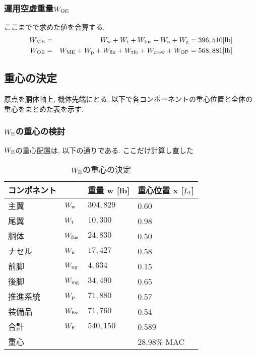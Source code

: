 \documentclass[12pt]{jsarticle}
\begin{document}
\subsubsection{運用空虚重量$W_{\rm OE}$}
ここまでで求めた値を合算する.
\begin{eqnarray*}
W_{\rm ME} &=& W_{\rm w} + W_{\rm t} + W_{\rm fus} + W_{\rm n} + W_{\rm g} = 396,510 [\rm lb] \\
W_{\rm OE} &=& W_{\rm ME} + W_{\rm p} + W_{\rm fix} + W_{\rm tfo} + W_{\rm crew} + W_{\rm OP} = 568,881 [\rm lb]
\end{eqnarray*}

\subsection{重心の決定}
原点を胴体軸上, 機体先端にとる. 以下で各コンポーネントの重心位置と全体の重心をまとめた表を示す.\subsubsection{$W_{\rm E}$の重心の検討}
$W_{\rm E}$の重心配置は, 以下の通りである. ここだけ計算し直した
\begin{table}[H]
	\caption{$W_{\rm E}$の重心の決定}
	\begin{center}
		\begin{tabular}{p{2cm} p{2cm} p{3cm} p{3cm}} \hline
			コンポネント  & & 重量 w [lb] & 重心位置 x [$L_{\rm f}$] \\ \hline \hline
			主翼 & $W_{\rm w}$ & $304,829$ & 0.60 \\
			尾翼 & $W_{\rm t}$ & $10,300$ & 0.98 \\
			胴体 & $W_{\rm fus}$ & $24,830$ & 0.50 \\
			ナセル & $W_{\rm n}$ & $17,427$ & 0.58 \\
			前脚 & $W_{\rm ng}$ & $4,634$ & 0.15 \\
			後脚 & $W_{\rm mg}$ & $34,490$ & 0.65 \\
			推進系統 & $W_{\rm p}$ & $71,880$ & 0.57 \\
			装備品 & $W_{\rm fix}$ & $71,760$ & 0.54 \\ \hline
			合計 & $W_{\rm E}$ & $540,150$ & 0.589 \\ \hline \hline
			重心 & & & 28.98\% MAC \\ \hline
		\end{tabular}
	\end{center}
\end{table}
\end{document}
